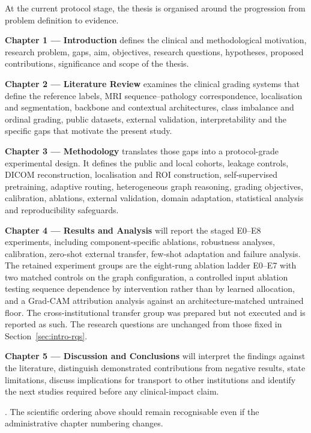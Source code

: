 At the current protocol stage, the thesis is organised around the progression from
problem definition to evidence.

\textbf{Chapter 1 --- Introduction} defines the clinical and methodological
motivation, research problem, gaps, aim, objectives, research questions, hypotheses,
proposed contributions, significance and scope of the thesis.

\textbf{Chapter 2 --- Literature Review} examines the clinical grading systems that
define the reference labels, MRI sequence--pathology correspondence, localisation
and segmentation, backbone and contextual architectures, class imbalance and
ordinal grading, public datasets, external validation, interpretability and the
specific gaps that motivate the present study.

\textbf{Chapter 3 --- Methodology} translates those gaps into a protocol-grade
experimental design. It defines the public and local cohorts, leakage controls,
DICOM reconstruction, localisation and ROI construction, self-supervised
pretraining, adaptive routing, heterogeneous graph reasoning, grading objectives,
calibration, ablations, external validation, domain adaptation, statistical analysis
and reproducibility safeguards.

\textbf{Chapter 4 --- Results and Analysis} will report the staged E0--E8
experiments, including component-specific ablations, robustness analyses,
calibration, zero-shot external transfer, few-shot adaptation and failure analysis.
The retained experiment groups are the eight-rung ablation ladder E0--E7 with two
matched controls on the graph configuration, a controlled input ablation testing
sequence dependence by intervention rather than by learned allocation, and a
Grad-CAM attribution analysis against an architecture-matched untrained floor.
The cross-institutional transfer group was prepared but not executed and is
reported as such. The research questions are unchanged from those fixed in
Section~\ref{sec:intro-rqs}.

\textbf{Chapter 5 --- Discussion and Conclusions} will interpret the findings
against the literature, distinguish demonstrated contributions from negative
results, state limitations, discuss implications for transport to other institutions
and identify the next studies required before any clinical-impact claim.

. The scientific ordering above should remain recognisable even
if the administrative chapter numbering changes.

